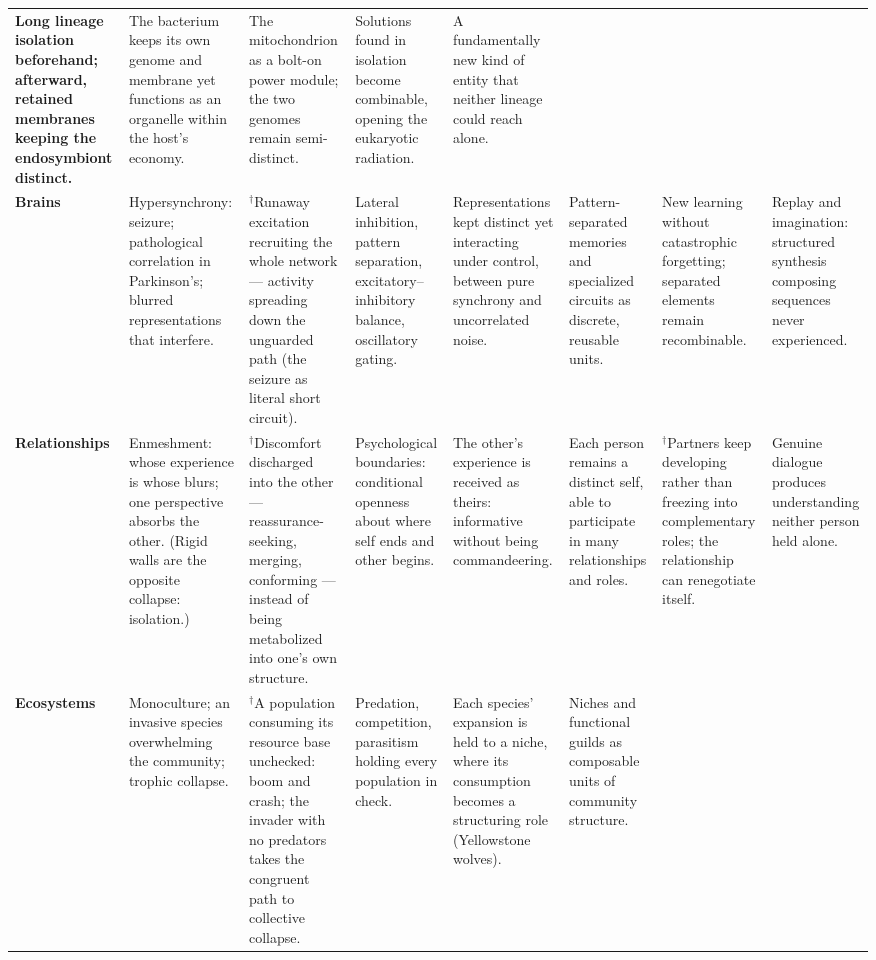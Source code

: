 \documentclass[11pt]{article}
\begin{document}
\begin{landscape}
\begin{table}[p]
\begin{tabularx}{\linewidth}{@{}>{\RaggedRight\arraybackslash\bfseries}p{1.9cm} Y Y Y Y Y Y Y@{}}
Long lineage isolation beforehand; afterward, retained membranes keeping the endosymbiont distinct. &
The bacterium keeps its own genome and membrane yet functions as an organelle within the host's economy. &
The mitochondrion as a bolt-on power module; the two genomes remain semi-distinct. &
Solutions found in isolation become combinable, opening the eukaryotic radiation. &
A fundamentally new kind of entity that neither lineage could reach alone. \\
\addlinespace
Brains &
Hypersynchrony: seizure; pathological correlation in Parkinson's; blurred representations that interfere. &
$^{\dagger}$Runaway excitation recruiting the whole network --- activity spreading down the unguarded path (the seizure as literal short circuit). &
Lateral inhibition, pattern separation, excitatory--inhibitory balance, oscillatory gating. &
Representations kept distinct yet interacting under control, between pure synchrony and uncorrelated noise. &
Pattern-separated memories and specialized circuits as discrete, reusable units. &
New learning without catastrophic forgetting; separated elements remain recombinable. &
Replay and imagination: structured synthesis composing sequences never experienced. \\
\addlinespace
Relationships &
Enmeshment: whose experience is whose blurs; one perspective absorbs the other. (Rigid walls are the opposite collapse: isolation.) &
$^{\dagger}$Discomfort discharged into the other --- reassurance-seeking, merging, conforming --- instead of being metabolized into one's own structure. &
Psychological boundaries: conditional openness about where self ends and other begins. &
The other's experience is received as theirs: informative without being commandeering. &
Each person remains a distinct self, able to participate in many relationships and roles. &
$^{\dagger}$Partners keep developing rather than freezing into complementary roles; the relationship can renegotiate itself. &
Genuine dialogue produces understanding neither person held alone. \\
\addlinespace
Ecosystems &
Monoculture; an invasive species overwhelming the community; trophic collapse. &
$^{\dagger}$A population consuming its resource base unchecked: boom and crash; the invader with no predators takes the congruent path to collective collapse. &
Predation, competition, parasitism holding every population in check. &
Each species' expansion is held to a niche, where its consumption becomes a structuring role (Yellowstone wolves). &
Niches and functional guilds as composable units of community structure. &

\end{tabularx}
\end{table}
\end{landscape}
\end{document}
